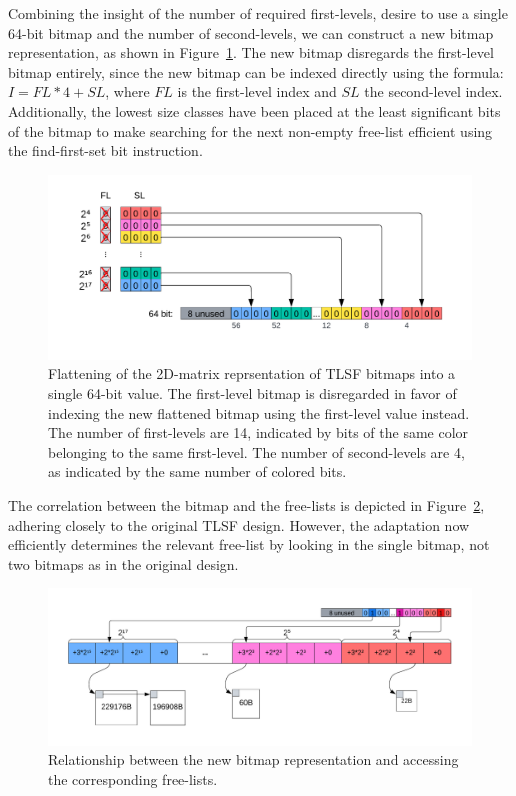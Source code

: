 Combining the insight of the number of required first-levels, desire to use a single 64-bit bitmap and the number of second-levels, we can construct a new bitmap representation, as shown in Figure~\ref{fig:bitmap_flattening}. The new bitmap disregards the first-level bitmap entirely, since the new bitmap can be indexed directly using the formula: $I = FL * 4 + SL$, where $FL$ is the first-level index and $SL$ the second-level index. Additionally, the lowest size classes have been placed at the least significant bits of the bitmap to make searching for the next non-empty free-list efficient using the find-first-set bit instruction.

\begin{figure}[H]
    \centering
    \includegraphics[width=1\textwidth]{figures/bitmap_flattening.png}
    \caption{Flattening of the 2D-matrix reprsentation of TLSF bitmaps into a single 64-bit value. The first-level bitmap is disregarded in favor of indexing the new flattened bitmap using the first-level value instead. The number of first-levels are 14, indicated by bits of the same color belonging to the same first-level. The number of second-levels are 4, as indicated by the same number of colored bits.}
    \label{fig:bitmap_flattening}
\end{figure}

The correlation between the bitmap and the free-lists is depicted in Figure~\ref{fig:bitmap_relationship}, adhering closely to the original TLSF design. However, the adaptation now efficiently determines the relevant free-list by looking in the single bitmap, not two bitmaps as in the original design.

\begin{figure}[H]
    \centering
    \includegraphics[width=1\textwidth]{figures/bitmap_relationship.png}
    \caption{Relationship between the new bitmap representation and accessing the corresponding free-lists.}
    \label{fig:bitmap_relationship}
\end{figure}

